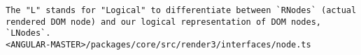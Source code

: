 \begin{verbatim}
The "L" stands for "Logical" to differentiate between `RNodes` (actual
rendered DOM node) and our logical representation of DOM nodes, `LNodes`.
<ANGULAR-MASTER>/packages/core/src/render3/interfaces/node.ts
\end{verbatim}
